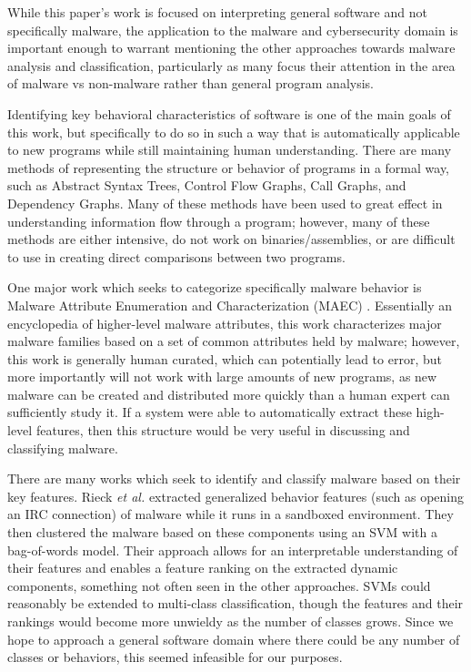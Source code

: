 While this paper's work is focused on interpreting general software and not specifically malware, the application to the malware and cybersecurity domain is important enough to warrant mentioning the other approaches towards malware analysis and classification, particularly as many focus their attention in the area of malware vs non-malware rather than general program analysis.

Identifying key behavioral characteristics of software is one of the main goals of this work, but specifically to do so in such a way that is automatically applicable to new programs while still maintaining human understanding. There are many methods of representing the structure or behavior of programs in a formal way, such as Abstract Syntax Trees, Control Flow Graphs, Call Graphs, and Dependency Graphs. Many of these methods have been used to great effect in understanding information flow through a program; however, many of these methods are either intensive, do not work on binaries/assemblies, or are difficult to use in creating direct comparisons between two programs.

One major work which seeks to categorize specifically malware behavior is Malware Attribute Enumeration and Characterization (MAEC) \cite{maec}. Essentially an encyclopedia of higher-level malware attributes, this work characterizes major malware families based on a set of common attributes held by malware; however, this work is generally human curated, which can potentially lead to error, but more importantly will not work with large amounts of new programs, as new malware can be created and distributed more quickly than a human expert can sufficiently study it. If a system were able to automatically extract these high-level features, then this structure would be very useful in discussing and classifying malware.

There are many works which seek to identify and classify malware based on their key features. Rieck \textit{et al.} \cite{rieck2008learning} extracted generalized behavior features (such as opening an IRC connection) of malware while it runs in a sandboxed environment. They then clustered the malware based on these components using an SVM with a bag-of-words model. Their approach allows for an interpretable understanding of their features and enables a feature ranking on the extracted dynamic components, something not often seen in the other approaches. SVMs could reasonably be extended to multi-class classification, though the features and their rankings would become more unwieldy as the number of classes grows. Since we hope to approach a general software domain where there could be any number of classes or behaviors, this seemed infeasible for our purposes.

